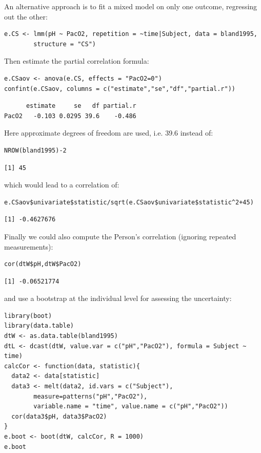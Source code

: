 \documentclass[12pt]{article}
\begin{document}
\bigskip

An alternative approach is to fit a mixed model on only one outcome,
regressing out the other:
\lstset{language=r,label= ,caption= ,captionpos=b,numbers=none}
\begin{lstlisting}
e.CS <- lmm(pH ~ PacO2, repetition = ~time|Subject, data = bland1995,
	    structure = "CS")
\end{lstlisting}

Then estimate the partial correlation formula:
\lstset{language=r,label= ,caption= ,captionpos=b,numbers=none}
\begin{lstlisting}
e.CSaov <- anova(e.CS, effects = "PacO2=0")
confint(e.CSaov, columns = c("estimate","se","df","partial.r"))
\end{lstlisting}

\begin{verbatim}
      estimate     se   df partial.r
PacO2   -0.103 0.0295 39.6    -0.486
\end{verbatim}


\clearpage

Here approximate degrees of freedom are used, i.e. 39.6 instead of:
\lstset{language=r,label= ,caption= ,captionpos=b,numbers=none}
\begin{lstlisting}
NROW(bland1995)-2
\end{lstlisting}

\begin{verbatim}
[1] 45
\end{verbatim}


which would lead to a correlation of:
\lstset{language=r,label= ,caption= ,captionpos=b,numbers=none}
\begin{lstlisting}
e.CSaov$univariate$statistic/sqrt(e.CSaov$univariate$statistic^2+45)
\end{lstlisting}

\begin{verbatim}
[1] -0.4627676
\end{verbatim}


Finally we could also compute the Person's correlation (ignoring
repeated measurements):
\lstset{language=r,label= ,caption= ,captionpos=b,numbers=none}
\begin{lstlisting}
cor(dtW$pH,dtW$PacO2)
\end{lstlisting}

\begin{verbatim}
[1] -0.06521774
\end{verbatim}


and use a bootstrap at the individual level for assessing the
uncertainty:
\lstset{language=r,label= ,caption= ,captionpos=b,numbers=none}
\begin{lstlisting}
library(boot)
library(data.table)
dtW <- as.data.table(bland1995)
dtL <- dcast(dtW, value.var = c("pH","PacO2"), formula = Subject ~ time)
calcCor <- function(data, statistic){
  data2 <- data[statistic]
  data3 <- melt(data2, id.vars = c("Subject"), 
		measure=patterns("pH","PacO2"),
		variable.name = "time", value.name = c("pH","PacO2"))
  cor(data3$pH, data3$PacO2)
}
e.boot <- boot(dtW, calcCor, R = 1000)
e.boot
\end{lstlisting}
\end{document}
